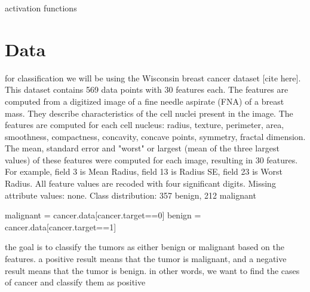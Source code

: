 \documentclass[twoside,11pt]{report}
\begin{document}
    activation functions




\section{Data}
\label{sec:data}

    for classification we will be using the Wisconsin breast cancer dataset [cite here]. This dataset contains 
    569 data points with 30 features each. The features are computed from a digitized image of a fine needle aspirate
    (FNA) of a breast mass. They describe characteristics of the cell nuclei present in the image. The features are 
    computed for each cell nucleus: radius, texture, perimeter, area, smoothness, compactness, concavity, 
    concave points, symmetry, fractal dimension. The mean, standard error and "worst" or largest 
    (mean of the three largest values) of these features were computed for each image, resulting in 30 features. 
    For example, field 3 is Mean Radius, field 13 is Radius SE, field 23 is Worst Radius.
    All feature values are recoded with four significant digits. Missing attribute values: none.
    Class distribution: 357 benign, 212 malignant

    malignant = cancer.data[cancer.target==0]
    benign = cancer.data[cancer.target==1]

    the goal is to classify the tumors as either benign or malignant based on the features.
    a positive result means that the tumor is malignant, and a negative result means that the tumor is benign.
    in other words, we want to find the cases of cancer and classify them as positive
\end{document}
